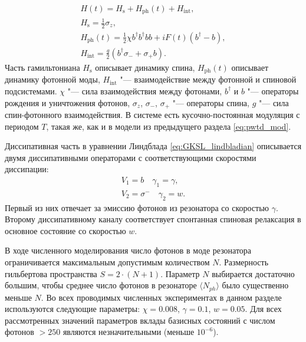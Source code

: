 \begin{equation}
	\label{eq:csp_H}
	\begin{gathered}
		H(t) = H_{\mathrm{s}} + H_{\mathrm{ph}}(t) + H_{\mathrm{int}},\\
		H_{\mathrm{s}} = \frac{1}{2}\sigma_z,\\
		H_{\mathrm{ph}}(t) = \frac{1}{2} \chi  b^\dagger b^\dagger b b + i F(t) \left( b^\dagger - b \right), \\
		H_{\mathrm{int}} = \frac{g}{2}\left( b^\dagger \sigma_{-} + \sigma_{+} b \right).   
	\end{gathered}
\end{equation}
Часть гамильтониана $H_{\mathrm{s}}$ описывает динамику спина, $H_{\mathrm{ph}}(t)$ описывает динамику фотонной моды, $H_{\mathrm{int}}$ "--- взаимодействие между фотонной и спиновой подсистемами. $\chi$ "--- сила взаимодействия между фотонами, $b^\dagger$ и $b$ "--- операторы рождения и уничтожения фотонов, $\sigma_{z}$, $\sigma_{-}$, $\sigma_{+}$ "--- операторы спина, $g$ "--- сила спин-фотонного взаимодействия.
В системе есть кусочно-постоянная модуляция с периодом $T$, такая же, как и в модели из предыдущего раздела \cref{eq:pwtd_mod}.

Диссипативная часть в уравнении Линдблада \cref{eq:GKSL_lindbladian} описывается двумя диссипативными операторами с соответствующими скоростями диссипации:
\begin{equation}
	\label{eq:csp_diss}
	\begin{gathered}
		V_1 = b \quad \gamma_1=\gamma, \\
		V_2 = \sigma^{-} \quad \gamma_2=w.
	\end{gathered}
\end{equation}
Первый из них отвечает за эмиссию фотонов из резонатора со скоростью $\gamma$. Второму диссипативному каналу соответствует спонтанная спиновая релаксация в основное состояние со скоростью $w$.

В ходе численного моделирования число фотонов в моде резонатора ограничивается максимальным допустимым количеством $N$. Размерность гильбертова пространства $S=2 \cdot (N+1)$. Параметр $N$ выбирается достаточно большим, чтобы среднее число фотонов в резонаторе $\langle N_{ph} \rangle$ было существенно меньше $N$. Во всех проводимых численных экспериментах в данном разделе используются следующие параметры: $\chi = 0.008$, $\gamma = 0.1$, $w=0.05$. Для всех рассмотренных значений параметров вклады базисных состояний с числом фотонов $>250$ являются незначительными (меньше $10^{-6}$).

